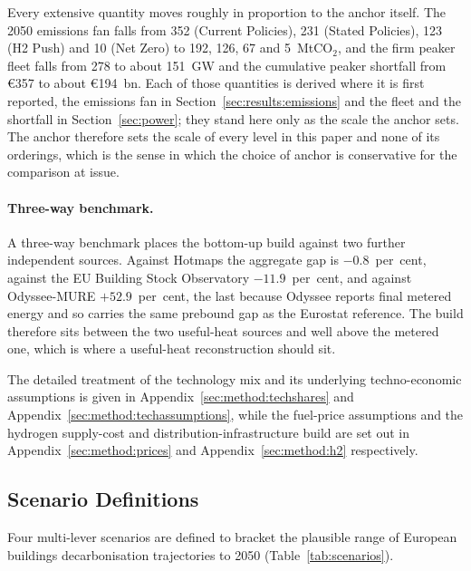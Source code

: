 Every extensive quantity moves roughly in proportion to the anchor itself. The 2050
emissions fan falls from 352 (Current Policies), 231 (Stated Policies), 123 (H2 Push) and 10 (Net Zero) to 192, 126, 67 and 5~MtCO$_2$, and the firm peaker fleet falls from 278 to about 151~GW and the cumulative peaker
shortfall from \euro{}357 to about \euro{}194~bn. Each of those quantities is derived
where it is first reported, the emissions fan in Section~\ref{sec:results:emissions} and
the fleet and the shortfall in Section~\ref{sec:power}; they stand here only as the
scale the anchor sets. The anchor therefore sets the scale of every
level in this paper and none of its orderings, which is the sense in which the choice of
anchor is conservative for the comparison at issue.

\paragraph{Three-way benchmark.} A three-way benchmark places the bottom-up build
against two further independent sources. Against Hotmaps the aggregate
gap is $-0.8$~per~cent, against the EU Building Stock Observatory $-11.9$~per~cent, and
against Odyssee-MURE $+52.9$~per~cent, the last because Odyssee reports final metered
energy and so carries the same prebound gap as the Eurostat reference. The build
therefore sits between the two useful-heat sources and well above the metered one, which
is where a useful-heat reconstruction should sit.

\noindent The detailed treatment of the technology mix and its underlying techno-economic
assumptions is given in Appendix~\ref{sec:method:techshares} and
Appendix~\ref{sec:method:techassumptions}, while the fuel-price assumptions and the
hydrogen supply-cost and distribution-infrastructure build are set out in
Appendix~\ref{sec:method:prices} and Appendix~\ref{sec:method:h2} respectively.

\subsection{Scenario Definitions}
\label{sec:method:scenarios}

Four multi-lever scenarios are defined to bracket the plausible range of European
buildings decarbonisation trajectories to 2050 (Table~\ref{tab:scenarios}).

